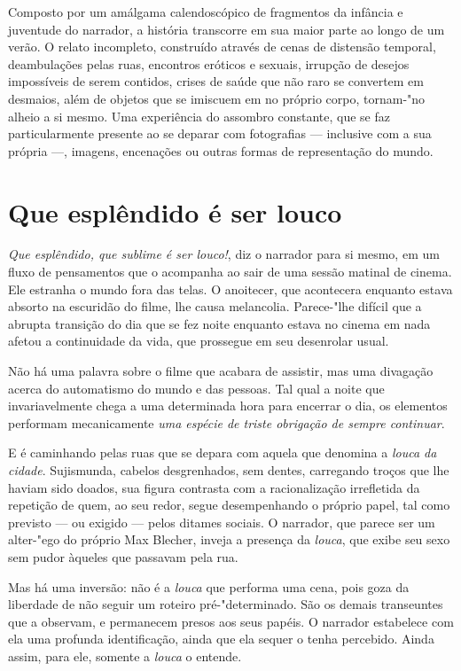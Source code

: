 Composto por um amálgama calendoscópico de fragmentos da infância e juventude do narrador, a história transcorre em sua maior parte ao longo de um verão. O relato incompleto, construído através de cenas de distensão temporal, deambulações pelas ruas, encontros eróticos e sexuais, irrupção de desejos impossíveis de serem contidos, crises de saúde que não raro se convertem em desmaios, além de objetos que se imiscuem em no próprio corpo, tornam-"no alheio a si mesmo. Uma experiência do assombro constante, que se faz particularmente presente ao se deparar com fotografias --- inclusive com a sua própria ---, imagens, encenações ou outras formas de representação do mundo.

\section{Que esplêndido é ser louco}

\textit{Que esplêndido, que sublime é ser louco!}, diz o narrador para si mesmo, em um fluxo de pensamentos que o acompanha ao sair de uma sessão matinal de cinema. Ele estranha o mundo fora das telas. O anoitecer, que acontecera enquanto estava absorto na escuridão do filme, lhe causa melancolia. Parece-"lhe difícil que a abrupta transição do dia que se fez noite enquanto estava no cinema em nada afetou a continuidade da vida, que prossegue em seu desenrolar usual.

Não há uma palavra sobre o filme que acabara de assistir, mas uma divagação acerca do automatismo do mundo e das pessoas. Tal qual a noite que invariavelmente chega a uma determinada hora para encerrar o dia, os elementos performam mecanicamente \textit{uma espécie de triste obrigação de sempre continuar}.

E é caminhando pelas ruas que se depara com aquela que denomina a \textit{louca da cidade}. Sujismunda, cabelos desgrenhados, sem dentes, carregando troços que lhe haviam sido doados, sua figura contrasta com a racionalização irrefletida da repetição de quem, ao seu redor, segue desempenhando o próprio papel, tal como previsto --- ou exigido --- pelos ditames sociais. O narrador, que parece ser um alter-"ego do próprio Max Blecher, inveja a presença da \textit{louca}, que exibe seu sexo sem pudor àqueles que passavam pela rua.

Mas há uma inversão: não é a \textit{louca} que performa uma cena, pois goza da liberdade de não seguir um roteiro pré-"determinado. São os demais transeuntes que a observam, e permanecem presos aos seus papéis. O narrador estabelece com ela uma profunda identificação, ainda que ela sequer o tenha percebido. Ainda assim, para ele, somente a \textit{louca} o entende.

